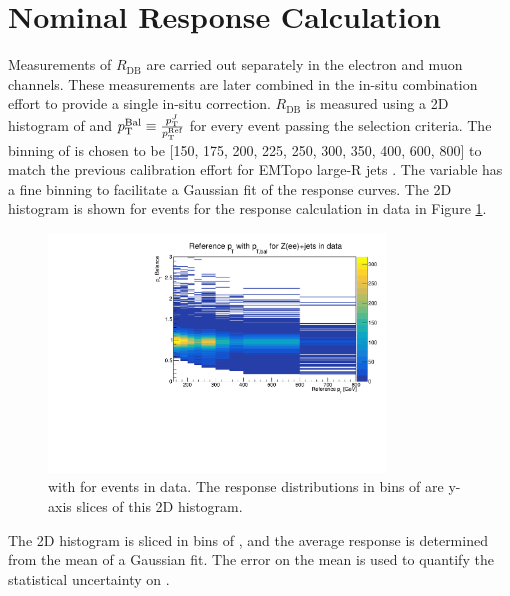 \section{Nominal Response Calculation}
Measurements of $R_{\text{DB}}$ are carried out separately in the electron and muon channels. These measurements are later combined in the in-situ combination effort to provide a single in-situ correction. $R_{\text{DB}}$ is measured using a 2D histogram of \ptref and $p_{\text{T}}^{\text{Bal}}\equiv\frac{p_{\text{T}}^J}{p_{\text{T}}^{\text{Ref}}}$ for every event passing the selection criteria. The binning of \ptref is chosen to be [150, 175, 200, 225, 250, 300, 350, 400, 600, 800] \GeV to match the previous calibration effort for EMTopo large-R jets \cite{Atlas:largercali}. The \ptbal variable has a fine binning to facilitate a Gaussian fit of the response curves. The 2D histogram is shown for \zee events for the response calculation in data in Figure \ref{fig:insitu:2dhistzeedata}.
\begin{figure}[t]
    \centering
    \includegraphics[width=0.8\textwidth]{plots/insitu/Response2D_Data_Zee.pdf}
    \caption{\ptref with \ptbal for \zee events in data. The response distributions in bins of \ptref are y-axis slices of this 2D histogram.\label{fig:insitu:2dhistzeedata}}
\end{figure}

The 2D histogram is sliced in bins of \ptref, and the average response \rdb is determined from the mean of a Gaussian fit. The error on the mean is used to quantify the statistical uncertainty on \ptbal. %

